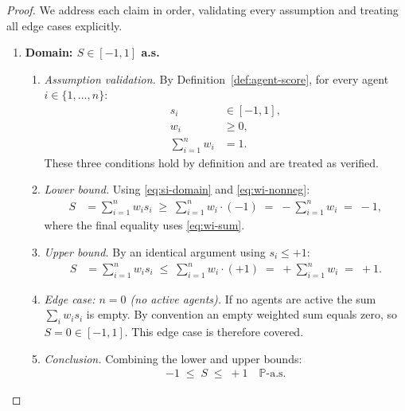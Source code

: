\documentclass[12pt,openany]{book}
\newcommand{\Prob}{\mathbb{P}}
\numberwithin{equation}{chapter}
\theoremstyle{plain}
\theoremstyle{definition}
\theoremstyle{remark}
\numberwithin{equation}{chapter}
\theoremstyle{plain}
\begin{document}
\begin{proof}
We address each claim in order, validating every assumption and
treating all edge cases explicitly.

\begin{enumerate}

  \item \textbf{Domain: $S \in [-1,1]$ a.s.}

  \begin{enumerate}
    \item \emph{Assumption validation.}
      By Definition~\ref{def:agent-score}, for every agent
      $i \in \{1,\ldots,n\}$:
      \begin{align}
        s_i &\in [-1,1], \label{eq:si-domain}\\
        w_i &\geq 0,      \label{eq:wi-nonneg}\\
        \sum_{i=1}^{n} w_i &= 1. \label{eq:wi-sum}
      \end{align}
      These three conditions hold by definition and are
      treated as verified.

    \item \emph{Lower bound.}
      Using \eqref{eq:si-domain} and \eqref{eq:wi-nonneg}:
      \begin{align}
        S
          &= \sum_{i=1}^{n} w_i s_i
           \;\geq\;
           \sum_{i=1}^{n} w_i \cdot (-1)
           \;=\;
           -\sum_{i=1}^{n} w_i
           \;=\;
           -1,
      \end{align}
      where the final equality uses \eqref{eq:wi-sum}.

    \item \emph{Upper bound.}
      By an identical argument using $s_i \leq +1$:
      \begin{align}
        S
          &= \sum_{i=1}^{n} w_i s_i
           \;\leq\;
           \sum_{i=1}^{n} w_i \cdot (+1)
           \;=\;
           +\sum_{i=1}^{n} w_i
           \;=\;
           +1.
      \end{align}

    \item \emph{Edge case: $n = 0$ (no active agents).}
      If no agents are active the sum $\sum_i w_i s_i$ is
      empty.  By convention an empty weighted sum equals zero,
      so $S = 0 \in [-1,1]$.  This edge case is therefore
      covered.

    \item \emph{Conclusion.}
      Combining the lower and upper bounds:
      \begin{align}
        -1 \;\leq\; S \;\leq\; +1 \quad \Prob\text{-a.s.}
      \end{align}
  \end{enumerate}


\end{enumerate}
\end{proof}
\end{document}
